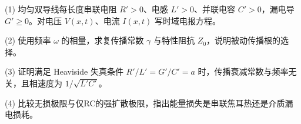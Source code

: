 (1) 均匀双导线每长度串联电阻 \(R'>0\)、电感 \(L'>0\)、并联电容 \(C'>0\)，漏电导 \(G'\ge0\)。对电压 \(V(x,t)\)、电流 \(I(x,t)\) 写时域电报方程。

(2) 使用频率 \(\omega\) 的相量，求复传播常数 \(\gamma\) 与特性阻抗 \(Z_0\)，说明被动传播根的选择。

(3) 证明满足 Heaviside 失真条件 \(R'/L'=G'/C'=a\) 时，传播衰减常数与频率无关，且相速度为 \(1/\sqrt{L'C'}\)。

(4) 比较无损极限与仅RC的强扩散极限，指出能量损失是串联焦耳热还是介质漏电损耗。
